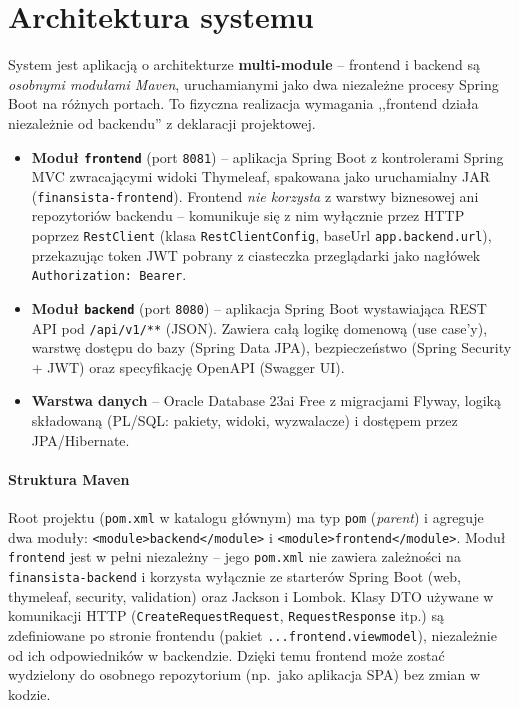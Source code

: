 \documentclass[12pt,a4paper]{article}
\begin{document}
\section{Architektura systemu}
\label{sec:architektura}

System jest aplikacją o architekturze \textbf{multi-module} -- frontend
i backend są \emph{osobnymi modułami Maven}, uruchamianymi jako dwa
niezależne procesy Spring Boot na różnych portach. To fizyczna realizacja
wymagania ,,frontend działa niezależnie od backendu'' z deklaracji projektowej.

\begin{itemize}[leftmargin=*]
  \item \textbf{Moduł \texttt{frontend}} (port \texttt{8081}) -- aplikacja
        Spring Boot z kontrolerami Spring MVC zwracającymi widoki Thymeleaf,
        spakowana jako uruchamialny JAR (\texttt{finansista-frontend}).
        Frontend \emph{nie korzysta} z warstwy biznesowej ani repozytoriów
        backendu -- komunikuje się z nim wyłącznie przez HTTP poprzez
        \texttt{RestClient} (klasa \texttt{RestClientConfig}, baseUrl
        \texttt{app.backend.url}), przekazując token JWT pobrany z ciasteczka
        przeglądarki jako nagłówek \texttt{Authorization: Bearer}.
  \item \textbf{Moduł \texttt{backend}} (port \texttt{8080}) -- aplikacja
        Spring Boot wystawiająca REST API pod \texttt{/api/v1/**} (JSON).
        Zawiera całą logikę domenową (use case'y), warstwę dostępu do bazy
        (Spring Data JPA), bezpieczeństwo (Spring Security + JWT) oraz
        specyfikację OpenAPI (Swagger UI).
  \item \textbf{Warstwa danych} -- Oracle Database 23ai Free z migracjami
        Flyway, logiką składowaną (PL/SQL: pakiety, widoki, wyzwalacze)
        i dostępem przez JPA/Hibernate.
\end{itemize}

\paragraph{Struktura Maven}
Root projektu (\texttt{pom.xml} w katalogu głównym) ma typ \texttt{pom}
(\emph{parent}) i agreguje dwa moduły:
\texttt{<module>backend</module>} i \texttt{<module>frontend</module>}.
Moduł \texttt{frontend} jest w pełni niezależny -- jego \texttt{pom.xml}
nie zawiera zależności na \texttt{finansista-backend} i korzysta wyłącznie
ze starterów Spring Boot (web, thymeleaf, security, validation) oraz
Jackson i Lombok. Klasy DTO używane w komunikacji HTTP
(\texttt{CreateRequestRequest}, \texttt{RequestResponse} itp.) są
zdefiniowane po stronie frontendu (pakiet
\texttt{...frontend.viewmodel}), niezależnie od ich odpowiedników
w backendzie. Dzięki temu frontend może zostać wydzielony do osobnego
repozytorium (np.\ jako aplikacja SPA) bez zmian w kodzie.
\end{document}
